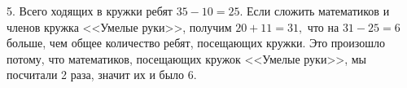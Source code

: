 5. Всего ходящих в кружки ребят $35-10=25.$ Если сложить математиков и членов кружка <<Умелые руки>>, получим $20+11=31,$ что на $31-25=6$ больше, чем общее количество ребят, посещающих кружки. Это произошло потому, что математиков, посещающих кружок <<Умелые руки>>, мы посчитали 2 раза, значит их и было 6.\\
